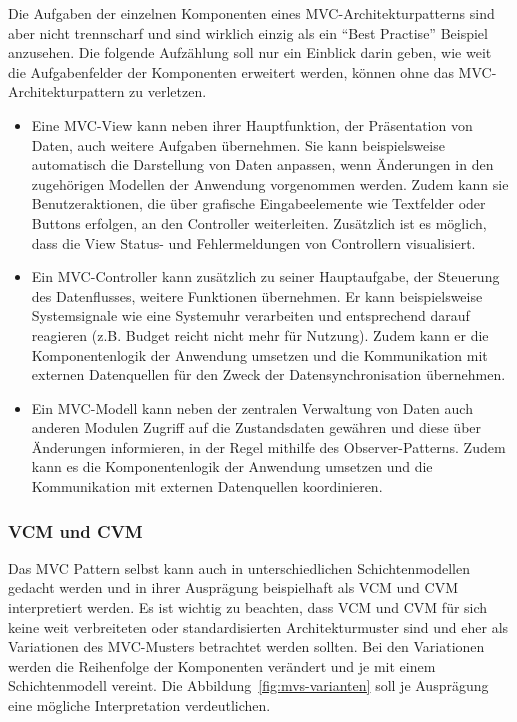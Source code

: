 \documentclass[../vs-script-first-v01.tex]{subfiles}
\begin{document}
Die Aufgaben der einzelnen Komponenten eines MVC-Architekturpatterns sind aber nicht trennscharf und sind wirklich einzig als ein \enquote{Best Practise} Beispiel anzusehen. Die folgende Aufzählung soll nur ein Einblick darin geben, wie weit die Aufgabenfelder der Komponenten erweitert werden, können ohne das MVC-Architekturpattern zu verletzen. 
\begin{itemize}
\item Eine MVC-View kann neben ihrer Hauptfunktion, der Präsentation von Daten, auch weitere Aufgaben übernehmen. Sie kann beispielsweise automatisch die Darstellung von Daten anpassen, wenn Änderungen in den zugehörigen Modellen der Anwendung vorgenommen werden. Zudem kann sie Benutzeraktionen, die über grafische Eingabeelemente wie Textfelder oder Buttons erfolgen, an den Controller weiterleiten. Zusätzlich ist es möglich, dass die View Status- und Fehlermeldungen von Controllern visualisiert.

\item Ein MVC-Controller kann zusätzlich zu seiner Hauptaufgabe, der Steuerung des Datenflusses, weitere Funktionen übernehmen. Er kann beispielsweise Systemsignale wie eine Systemuhr verarbeiten und entsprechend darauf reagieren (z.B. Budget reicht nicht mehr für Nutzung). Zudem kann er die Komponentenlogik der Anwendung umsetzen und die Kommunikation mit externen Datenquellen für den Zweck der Datensynchronisation übernehmen.

\item Ein MVC-Modell kann neben der zentralen Verwaltung von Daten auch anderen Modulen Zugriff auf die Zustandsdaten gewähren und diese über Änderungen informieren, in der Regel mithilfe des Observer-Patterns. Zudem kann es die Komponentenlogik der Anwendung umsetzen und die Kommunikation mit externen Datenquellen koordinieren.
\end{itemize}

\subsubsection{VCM und CVM}
Das MVC Pattern selbst kann auch in unterschiedlichen Schichtenmodellen gedacht werden und in ihrer Ausprägung beispielhaft als VCM und CVM interpretiert werden.  Es ist wichtig zu beachten, dass VCM und CVM für sich keine weit verbreiteten oder standardisierten Architekturmuster sind und eher als Variationen des MVC-Musters betrachtet werden sollten. Bei den Variationen werden die Reihenfolge der Komponenten verändert und je mit einem Schichtenmodell vereint. Die Abbildung~\ref{fig:mvs-varianten} soll je Ausprägung eine mögliche Interpretation verdeutlichen.
\end{document}
